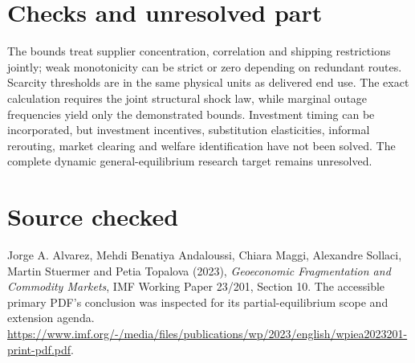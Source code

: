 \documentclass[11pt]{article}
\begin{document}
\section*{Checks and unresolved part}
The bounds treat supplier concentration, correlation and shipping restrictions jointly; weak monotonicity can be strict or zero depending on redundant routes. Scarcity thresholds are in the same physical units as delivered end use. The exact calculation requires the joint structural shock law, while marginal outage frequencies yield only the demonstrated bounds. Investment timing can be incorporated, but investment incentives, substitution elasticities, informal rerouting, market clearing and welfare identification have not been solved. The complete dynamic general-equilibrium research target remains unresolved.

\section*{Source checked}
Jorge A. Alvarez, Mehdi Benatiya Andaloussi, Chiara Maggi, Alexandre Sollaci, Martin Stuermer and Petia Topalova (2023), \emph{Geoeconomic Fragmentation and Commodity Markets}, IMF Working Paper 23/201, Section 10. The accessible primary PDF's conclusion was inspected for its partial-equilibrium scope and extension agenda. \url{https://www.imf.org/-/media/files/publications/wp/2023/english/wpiea2023201-print-pdf.pdf}.
\end{document}
